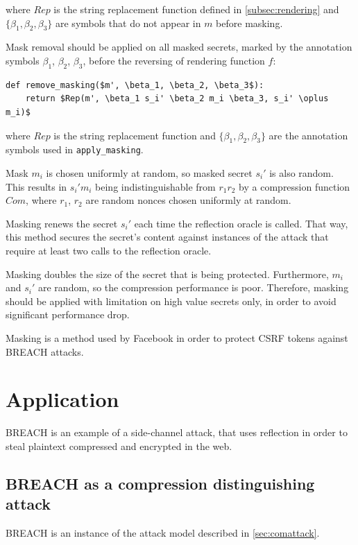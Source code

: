 \documentclass{sig-alternate-05-2015}
\begin{document}
where $Rep$ is the string replacement function defined in
\ref{subsec:rendering} and $\{\beta_1, \beta_2, \beta_3\}$ are symbols that do not
appear in $m$ before masking.

Mask removal should be applied on all masked secrets, marked by the annotation
symbols $\beta_1$, $\beta_2$, $\beta_3$, before the reversing of rendering function $f$:

\begin{lstlisting}[texcl,mathescape]
def remove_masking($m', \beta_1, \beta_2, \beta_3$):
    return $Rep(m', \beta_1 s_i' \beta_2 m_i \beta_3, s_i' \oplus m_i)$
\end{lstlisting}

where $Rep$ is the string replacement function and $\{\beta_1, \beta_2,
\beta_3\}$ are the annotation symbols used in \texttt{apply\_masking}.

Mask $m_i$ is chosen uniformly at random, so masked secret $s_i'$ is also
random. This results in $s_i' m_i$ being indistinguishable from $r_1 r_2$ by a
compression function $Com$, where $r_1$, $r_2$ are random nonces chosen
uniformly at random.

Masking renews the secret $s_i'$ each time the reflection oracle is called. That
way, this method secures the secret's content against instances of the attack
that require at least two calls to the reflection oracle.

Masking doubles the size of the secret that is being protected. Furthermore,
$m_i$ and $s_i'$ are random, so the compression performance is poor. Therefore,
masking should be applied with limitation on high value secrets only, in order
to avoid significant performance drop.

Masking is a method used by Facebook \cite{c9} in order to protect CSRF tokens
against BREACH attacks.

\section{Application}\label{sec:application}

BREACH is an example of a side-channel attack, that uses reflection in
order to steal plaintext compressed and encrypted in the web.

\subsection{BREACH as a compression distinguishing
attack}\label{subsec:breachapp}
BREACH is an instance of the attack model described in \ref{sec:comattack}.
\end{document}
